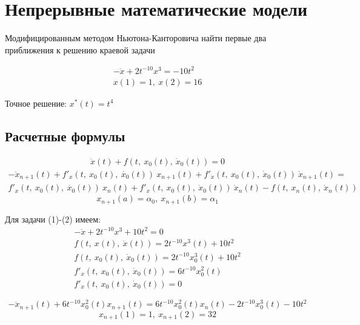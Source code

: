 \documentclass[12pt]{article}
\begin{document}
\section*{Непрерывные математические модели}

Модифицированным методом Ньютона-Канторовича найти первые два приближения к решению краевой задачи

\begin{gather}
	-\ddot{x} + 2t^{-10}x^3 = -10t^2 \\
	x(1)=1,\ x(2)=16
\end{gather}

Точное решение: $x^*(t) = t^4$

\subsection*{Расчетные формулы}



\begin{gather}
\ddot{x}(t) + f(t,\ x_0(t),\ \dot{x}_0(t)) = 0
\end{gather}
\begin{multline}
	-\ddot{x}_{n+1}(t) + f'_x(t,\ x_0(t),\ \dot{x_0}(t))\ x_{n+1}(t) +
	f'_{\dot{x}}(t,\ x_0(t),\ \dot{x}_0(t))\ \dot{x}_{n+1}(t) = \\
	f'_x(t,\ x_0(t),\ \dot{x_0}(t))\ x_n(t) +
	f'_{\dot{x}}(t,\ x_0(t),\ \dot{x}_0(t))\ \dot{x}_n(t) -
	f(t,\ x_n(t),\ \dot{x}_n(t))
\end{multline}
\begin{equation}
	x_{n+1}(a) = \alpha_0,\ x_{n+1}(b) = \alpha_1
\end{equation}

Для задачи (1)-(2) имеем:
\begin{gather*}
	-\ddot{x} + 2t^{-10}x^3 + 10t^2 = 0 \\
	f(t,\ x(t),\ \dot{x}(t)) = 2t^{-10}x^3(t) + 10t^2 \\
	f(t,\ x_0(t),\ \dot{x}_0(t)) = 2t^{-10}x^3_0(t) + 10t^2 \\
	f'_x(t,\ x_0(t),\ \dot{x}_0(t)) = 6t^{-10}x^2_0(t) \\
	f'_{\dot{x}}(t,\ x_0(t),\ \dot{x}_0(t)) = 0
\end{gather*}

\begin{equation}
-\ddot{x}_{n+1}(t) + 6t^{-10}x^2_0(t)x_{n+1}(t) =
 6t^{-10}x^2_0(t)x_n(t) - 2t^{-10}x^3_0(t) - 10t^2
\end{equation}
\begin{equation}
x_{n+1}(1)=1,\ x_{n+1}(2)=32
\end{equation}
\end{document}
